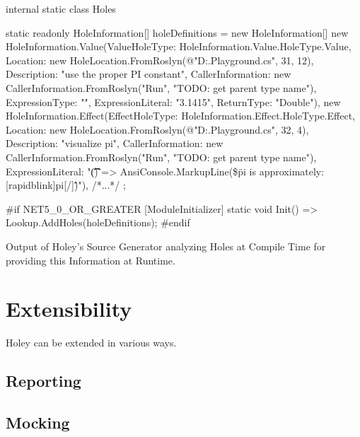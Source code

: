 \begin{program}[ht]
\begin{CsCode}
internal static class Holes
{
    static readonly HoleInformation[] holeDefinitions = new HoleInformation[]
    {
        new HoleInformation.Value(ValueHoleType: HoleInformation.Value.HoleType.Value, Location: new HoleLocation.FromRoslyn(@"D:\code\holey\dotnet\src\Holey.Playground\HoleTypesExample.cs", 31, 12), Description: "use the proper PI constant", CallerInformation: new CallerInformation.FromRoslyn("Run", "TODO: get parent type name"), ExpressionType: "", ExpressionLiteral: "3.1415", ReturnType: "Double"),
        new HoleInformation.Effect(EffectHoleType: HoleInformation.Effect.HoleType.Effect, Location: new HoleLocation.FromRoslyn(@"D:\code\holey\dotnet\src\Holey.Playground\HoleTypesExample.cs", 32, 4), Description: "visualize pi", CallerInformation: new CallerInformation.FromRoslyn("Run", "TODO: get parent type name"), ExpressionLiteral: "\t\t\t\t() => AnsiConsole.MarkupLine(\$\"pi is approximately: [rapidblink]{pi}[/]\")\r\n"),
        /*...*/
    };

#if NET5_0_OR_GREATER
    [ModuleInitializer]
    static void Init() => Lookup.AddHoles(holeDefinitions);
#endif
}
\end{CsCode}
\caption{Output of Holey's Source Generator analyzing Holes at Compile Time for providing this Information at Runtime.}
\label{prg:holey-source-generators}
\end{program}

\section{Extensibility}
\label{sec:holey-extensibility}

Holey can be extended in various ways.



\subsection{Reporting}
\label{sec:reporting}

\subsection{Mocking}

